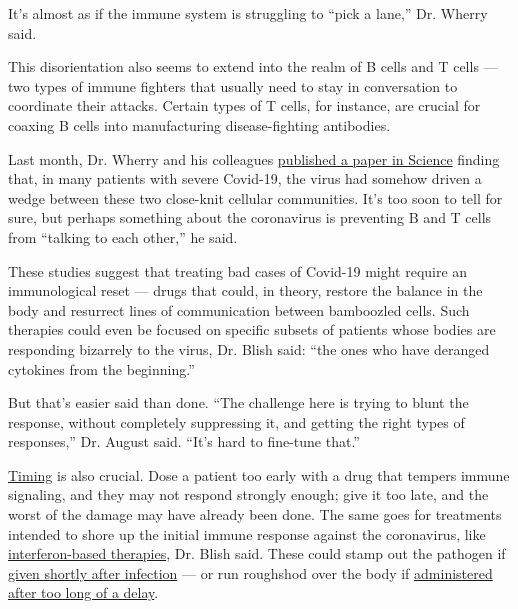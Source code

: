 It's almost as if the immune system is struggling to ``pick a lane,''
Dr. Wherry said.

This disorientation also seems to extend into the realm of B cells and T
cells --- two types of immune fighters that usually need to stay in
conversation to coordinate their attacks. Certain types of T cells, for
instance, are crucial for coaxing B cells into manufacturing
disease-fighting antibodies.

Last month, Dr. Wherry and his colleagues
\href{https://science.sciencemag.org/content/early/2020/07/15/science.abc8511}{published
a paper in Science} finding that, in many patients with severe Covid-19,
the virus had somehow driven a wedge between these two close-knit
cellular communities. It's too soon to tell for sure, but perhaps
something about the coronavirus is preventing B and T cells from
``talking to each other,'' he said.

These studies suggest that treating bad cases of Covid-19 might require
an immunological reset --- drugs that could, in theory, restore the
balance in the body and resurrect lines of communication between
bamboozled cells. Such therapies could even be focused on specific
subsets of patients whose bodies are responding bizarrely to the virus,
Dr. Blish said: ``the ones who have deranged cytokines from the
beginning.''

But that's easier said than done. ``The challenge here is trying to
blunt the response, without completely suppressing it, and getting the
right types of responses,'' Dr. August said. ``It's hard to fine-tune
that.''

\href{https://www.nationalgeographic.com/science/2020/05/how-quieting-cytokine-storms-could-be-key-to-treating-severe-cvd/}{Timing}
is also crucial. Dose a patient too early with a drug that tempers
immune signaling, and they may not respond strongly enough; give it too
late, and the worst of the damage may have already been done. The same
goes for treatments intended to shore up the initial immune response
against the coronavirus, like
\href{https://www.nytimes3xbfgragh.onion/2020/07/20/world/covid-19-treatment-synairgen-interferon-beta.html}{interferon-based
therapies}, Dr. Blish said. These could stamp out the pathogen if
\href{https://www.cell.com/cell-host-microbe/fulltext/S1931-3128(20)30401-7}{given
shortly after infection} --- or run roughshod over the body if
\href{https://science.sciencemag.org/content/early/2020/06/10/science.abc3545}{administered
after too long of a delay}.

